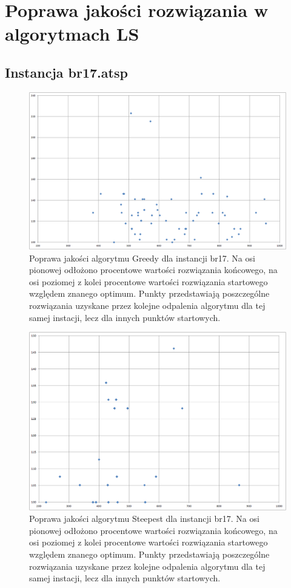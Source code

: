 \section{Poprawa jakości rozwiązania w algorytmach LS}
\subsection{Instancja br17.atsp}
\begin{figure}[!h]
\centering\includegraphics[width=12cm]{img/br17_b2e_g.png}
\caption{Poprawa jakości algorytmu Greedy dla instancji br17. Na osi pionowej odłożono procentowe wartości rozwiązania końcowego, na osi poziomej z kolei procentowe wartości rozwiązania startowego względem znanego optimum. Punkty przedstawiają poszczególne rozwiązania uzyskane przez kolejne odpalenia algorytmu dla tej samej instacji, lecz dla innych punktów startowych.}\label{rys:br17g}
\end{figure}
\begin{figure}[!h]
\centering\includegraphics[width=12cm]{img/br17_b2e_s.png}
\caption{Poprawa jakości algorytmu Steepest dla instancji br17. Na osi pionowej odłożono procentowe wartości rozwiązania końcowego, na osi poziomej z kolei procentowe wartości rozwiązania startowego względem znanego optimum. Punkty przedstawiają poszczególne rozwiązania uzyskane przez kolejne odpalenia algorytmu dla tej samej instacji, lecz dla innych punktów startowych.}\label{rys:br17s}
\end{figure}

